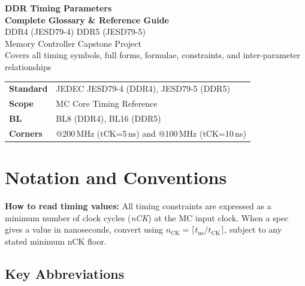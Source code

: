 \documentclass[11pt,a4paper]{article}
\newcommand{\unit}[1]{\textit{#1}}
\begin{document}
\begin{titlepage}
  \centering
  \vspace*{2cm}
  {\Huge\bfseries\color{ddrblue} DDR Timing Parameters\\[0.4em]
  \Large Complete Glossary \& Reference Guide}\\[1.5em]
  {\large\color{ddrteal} DDR4 (JESD79-4) \quad\textbullet\quad DDR5 (JESD79-5)}\\[1em]
  {\normalsize Memory Controller Capstone Project}\\[0.5em]
  {\normalsize\color{gray} Covers all timing symbols, full forms, formulae, constraints, and inter-parameter relationships}
  \vfill
  \begin{tabular}{ll}
    \textbf{Standard} & JEDEC JESD79-4 (DDR4), JESD79-5 (DDR5) \\
    \textbf{Scope}     & MC Core Timing Reference \\
    \textbf{BL}        & BL8 (DDR4), BL16 (DDR5) \\
    \textbf{Corners}   & @200\,MHz (tCK=5\,ns) and @100\,MHz (tCK=10\,ns) \\
  \end{tabular}
  \vspace{2cm}
\end{titlepage}

\tableofcontents
\newpage

\section{Notation and Conventions}

\begin{notebox}
\textbf{How to read timing values:} All timing constraints are expressed as a minimum number of clock cycles 
(\unit{nCK}) at the MC input clock. When a spec gives a value in nanoseconds, convert using
$n_{\text{CK}} = \lceil t_{\text{ns}} / t_{\text{CK}} \rceil$, subject to any stated minimum nCK floor.
\end{notebox}

\subsection{Key Abbreviations}
\end{document}
